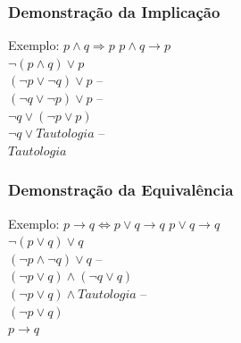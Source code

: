 \documentclass{beamer}
\begin{document}
\begin{frame}
\frametitle{Demonstração da Implicação}

\begin{exampleblock}{Exemplo: $p \wedge q \Rightarrow p$}
$p \wedge  q \rightarrow p$\\
$\neg (p \wedge q) \vee p$\\
$(\neg p \vee \neg q) \vee p$ -- \\
$(\neg q \vee \neg p) \vee p$ -- \\
$\neg q \vee (\neg p \vee p)$\\
$\neg q \vee Tautologia$  -- \\
$Tautologia$ \\
\end{exampleblock}
\end{frame}

\begin{frame}
\frametitle{Demonstração da Equivalência}

\begin{exampleblock}{Exemplo: $p \rightarrow q \Leftrightarrow p \vee q \rightarrow q$}
$p \vee q \rightarrow q$\\
$\neg (p \vee q) \vee q$\\
$(\neg p \wedge \neg q) \vee q$ -- \\
$(\neg p \vee q) \wedge (\neg q \vee q)$\\
$(\neg p \vee q) \wedge Tautologia$ -- \\
$(\neg p \vee q)$\\
$p \rightarrow q$
\end{exampleblock}
\end{frame}
\end{document}
